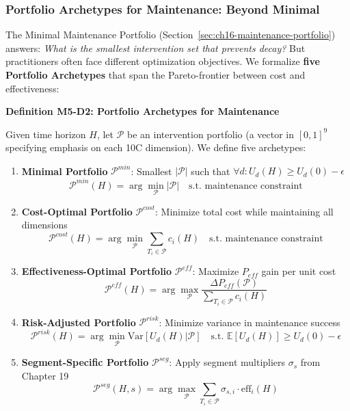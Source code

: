\subsubsection{Portfolio Archetypes for Maintenance: Beyond Minimal}
\label{sec:ch16-portfolio-archetypes}

The Minimal Maintenance Portfolio (Section~\ref{sec:ch16-maintenance-portfolio}) answers: \textit{What is the smallest intervention set that prevents decay?} But practitioners often face different optimization objectives. We formalize \textbf{five Portfolio Archetypes} that span the Pareto-frontier between cost and effectiveness:

\begin{tcolorbox}[colback=purple!5!white, colframe=purple!75!black, title=Portfolio Archetype Definitions (M5-D2)]

\textbf{Definition M5-D2: Portfolio Archetypes for Maintenance}

Given time horizon $H$, let $\mathcal{P}$ be an intervention portfolio (a vector in $[0,1]^9$ specifying emphasis on each 10C dimension). We define five archetypes:

\begin{enumerate}[nosep]
\item \textbf{Minimal Portfolio} $\mathcal{P}^{min}$: Smallest $|\mathcal{P}|$ such that $\forall d: U_d(H) \geq U_d(0) - \epsilon$
\[
\mathcal{P}^{min}(H) = \arg\min_{\mathcal{P}} |\mathcal{P}| \quad \text{s.t. maintenance constraint}
\]

\item \textbf{Cost-Optimal Portfolio} $\mathcal{P}^{cost}$: Minimize total cost while maintaining all dimensions
\[
\mathcal{P}^{cost}(H) = \arg\min_{\mathcal{P}} \sum_{T_i \in \mathcal{P}} c_i(H) \quad \text{s.t. maintenance constraint}
\]

\item \textbf{Effectiveness-Optimal Portfolio} $\mathcal{P}^{eff}$: Maximize $P_{eff}$ gain per unit cost
\[
\mathcal{P}^{eff}(H) = \arg\max_{\mathcal{P}} \frac{\Delta P_{eff}(\mathcal{P})}{\sum_{T_i \in \mathcal{P}} c_i(H)}
\]

\item \textbf{Risk-Adjusted Portfolio} $\mathcal{P}^{risk}$: Minimize variance in maintenance success
\[
\mathcal{P}^{risk}(H) = \arg\min_{\mathcal{P}} \text{Var}[U_d(H) | \mathcal{P}] \quad \text{s.t. } \mathbb{E}[U_d(H)] \geq U_d(0) - \epsilon
\]

\item \textbf{Segment-Specific Portfolio} $\mathcal{P}^{seg}$: Apply segment multipliers $\sigma_s$ from Chapter 19
\[
\mathcal{P}^{seg}(H, s) = \arg\max_{\mathcal{P}} \sum_{T_i \in \mathcal{P}} \sigma_{s,i} \cdot \text{eff}_i(H)
\]
\end{enumerate}

\end{tcolorbox}

